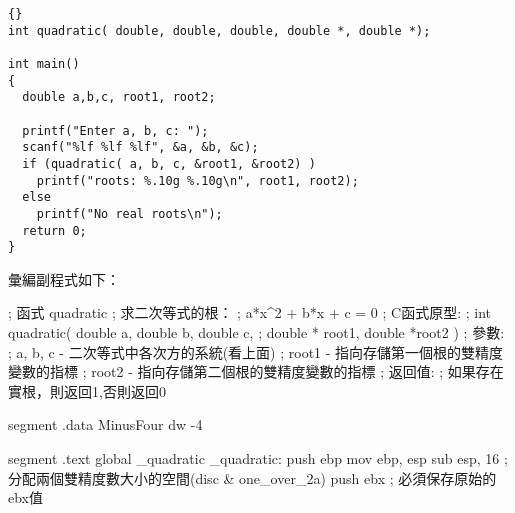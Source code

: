 {\begin{lstlisting}{}
int quadratic( double, double, double, double *, double *);

int main()
{
  double a,b,c, root1, root2;

  printf("Enter a, b, c: ");
  scanf("%lf %lf %lf", &a, &b, &c);
  if (quadratic( a, b, c, &root1, &root2) )
    printf("roots: %.10g %.10g\n", root1, root2);
  else
    printf("No real roots\n");
  return 0;
}
\end{lstlisting}

彙編副程式如下：
\begin{AsmCodeListing}[label=quad.asm,commentchar=$]
; 函式 quadratic
; 求二次等式的根：
;       a*x^2 + b*x + c = 0
; C函式原型:
;   int quadratic( double a, double b, double c,
;                  double * root1, double *root2 )
; 參數:
;   a, b, c - 二次等式中各次方的系統(看上面)
;   root1   - 指向存儲第一個根的雙精度變數的指標
;   root2   - 指向存儲第二個根的雙精度變數的指標
; 返回值:
;   如果存在實根，則返回1,否則返回0


segment .data
MinusFour       dw      -4

segment .text
        global  _quadratic
_quadratic:
        push    ebp
        mov     ebp, esp
        sub     esp, 16         ; 分配兩個雙精度數大小的空間(disc & one_over_2a)
        push    ebx             ; 必須保存原始的ebx值


\end{AsmCodeListing}}
